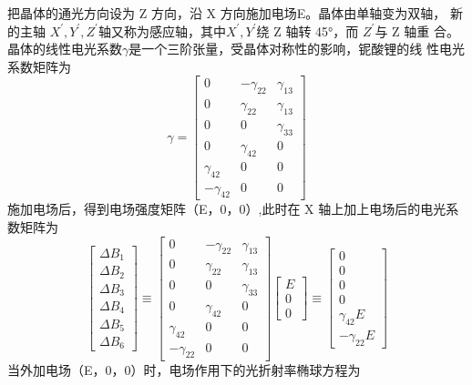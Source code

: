 \documentclass[UTF8]{ctexart}
\begin{document}
把晶体的通光方向设为 Z 方向，沿 X 方向施加电场E。晶体由单轴变为双轴，
新的主轴 $X^{'},Y^{'},Z^{'}$轴又称为感应轴，其中$X^{'},Y^{'}$绕 Z 轴转 45°，而 $Z^{'}$与 Z 轴重
合。晶体的线性电光系数$\gamma$是一个三阶张量，受晶体对称性的影响，铌酸锂的线
性电光系数矩阵为
\begin{equation}
	\gamma=\left[\begin{array}{ccc}
	0 & -\gamma_{22} & \gamma_{13} \\
	0 & \gamma_{22} & \gamma_{13} \\
	0 & 0 & \gamma_{33} \\
	0 & \gamma_{42} & 0 \\
	\gamma_{42} & 0 & 0 \\
	-\gamma_{42} & 0 & 0
	\end{array}\right]
	\end{equation}
施加电场后，得到电场强度矩阵（E，0，0）,此时在 X 轴上加上电场后的电光系数矩阵为
\begin{equation}
	\left[\begin{array}{l}
	\Delta B_{1} \\
	\Delta B_{2} \\
	\Delta B_{3} \\
	\Delta B_{4} \\
	\Delta B_{5} \\
	\Delta B_{6}
	\end{array}\right] \equiv\left[\begin{array}{ccc}
	0 & -\gamma_{22} & \gamma_{13} \\
	0 & \gamma_{22} & \gamma_{13} \\
	0 & 0 & \gamma_{33} \\
	0 & \gamma_{42} & 0 \\
	\gamma_{42} & 0 & 0 \\
	-\gamma_{22} & 0 & 0
	\end{array}\right]\left[\begin{array}{c}
	E \\
	0 \\
	0
	\end{array}\right] \equiv\left[\begin{array}{c}
	0 \\
	0 \\
	0 \\
	0 \\
	\gamma_{42} E \\
	-\gamma_{22} E
	\end{array}\right]
	\end{equation}
当外加电场（E，0，0）时，电场作用下的光折射率椭球方程为
\end{document}
